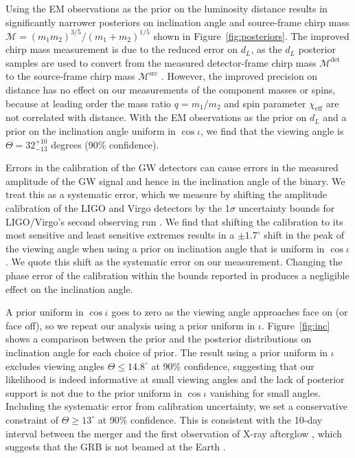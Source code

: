 Using the EM observations as the prior on the luminosity distance results in significantly narrower posteriors on inclination angle and source-frame chirp mass $\mathcal{M} = (m_1 m_2)^{3/5}/(m_1 + m_2)^{1/5}$ shown in Figure~\ref{fig:posteriors}. The improved chirp mass measurement is due to the reduced error on $d_L$, as the $d_L$ posterior samples are used to convert from the measured detector-frame chirp mass $\mathcal{M}^\mathrm{det}$ to the source-frame chirp mass $\mathcal{M}^\mathrm{src}$ \cite{Schutz:1986gp,Finn:1992xs}. However, the improved precision on distance has no effect on our measurements of the component masses or spins, because at leading order the mass ratio $q = m_1/m_2$ and spin parameter $\chi_\mathrm{eff}$ \cite{Cutler:1994ys} are not correlated with distance. With the EM observations as the prior on $d_L$ and a prior on the inclination angle uniform in $\cos\iota$, we find that the viewing angle is $\Theta = 32^{+10}_{-13}$ degrees (90\% confidence).

Errors in the calibration of the GW detectors can cause errors in the measured amplitude of the GW signal and hence in the inclination angle of the binary. We treat this as a systematic error, which we measure by shifting the amplitude calibration of the LIGO and Virgo detectors by the 1$\sigma$ uncertainty bounds for LIGO/Virgo's second observing run \cite{Cahillane:2017vkb}. We find that shifting the calibration to its most sensitive and least sensitive extremes results in a $\pm 1.7^\circ$ shift in the peak of the viewing angle when using a prior on inclination angle that is uniform in $\cos \iota$. We quote this shift as the systematic error on our measurement. Changing the phase error of the calibration within the bounds reported in \cite{Cahillane:2017vkb} produces a negligible effect on the inclination angle.

A prior uniform in $\cos\iota$ goes to zero as the viewing angle approaches face on (or face off), so we repeat our analysis using a prior uniform in $\iota$. Figure~\ref{fig:inc} shows a comparison between the prior and the posterior distributions on inclination angle for each choice of prior. The result using a prior uniform in $\iota$ excludes viewing angles $\Theta \le 14.8^\circ$ at 90\% confidence, suggesting that our likelihood is indeed informative at small viewing angles and the lack of posterior support is not due to the prior uniform in $\cos\iota$ vanishing for small angles. Including the systematic error from calibration uncertainty, we set a conservative constraint of $\Theta \ge 13^\circ$ at 90\% confidence. This is consistent with the 10-day interval between the merger and the first observation of X-ray afterglow \cite{Troja:2017nqp}, which suggests that the GRB is not beamed at the Earth \cite{Guidorzi:2017ogy}.

